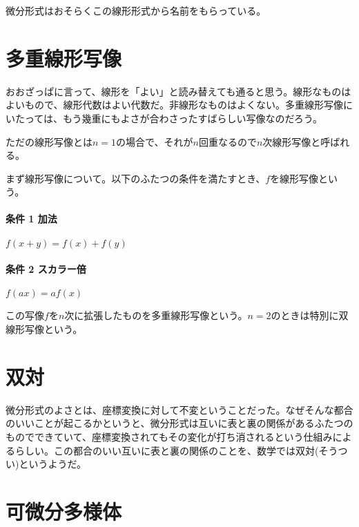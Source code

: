 微分形式はおそらくこの線形形式から名前をもらっている。

\newpage


\section{多重線形写像}

おおざっぱに言って、線形を「よい」と読み替えても通ると思う。線形なものはよいもので、線形代数はよい代数だ。非線形なものはよくない。多重線形写像にいたっては、もう幾重にもよさが合わさったすばらしい写像なのだろう。

ただの線形写像とは$n=1$の場合で、それが$n$回重なるので$n$次線形写像と呼ばれる。

\hrulefill

まず線形写像について。以下のふたつの条件を満たすとき、$ f $を線形写像という。

\paragraph{条件 1 加法}

$ f(x + y) = f(x) + f(y) $

\paragraph{条件 2 スカラー倍}

$ f(ax) = a f(x) $

この写像$f$を$n$次に拡張したものを多重線形写像という。$n=2$のときは特別に双線形写像という。

\newpage


\section{双対}

微分形式のよさとは、座標変換に対して不変ということだった。なぜそんな都合のいいことが起こるかというと、微分形式は互いに表と裏の関係があるふたつのものでできていて、座標変換されてもその変化が打ち消されるという仕組みによるらしい。この都合のいい互いに表と裏の関係のことを、数学では双対(そうつい)というようだ。

\newpage


\section{可微分多様体}

